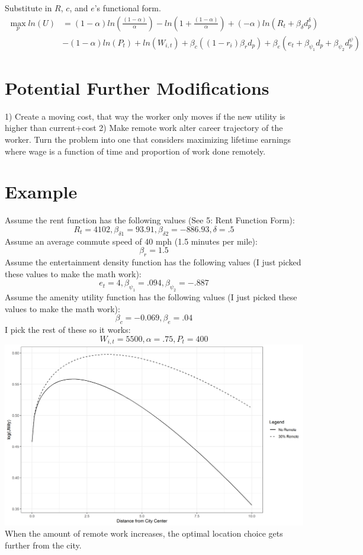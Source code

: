 \documentclass{article}
\begin{document}
Substitute in $R$, $c$, and $e$'s functional form.
\begin{equation*}
    \begin{aligned}
    \max_{p} ln(U) & = (1-\alpha)ln(\frac{(1 - \alpha)}{\alpha}) - ln(1 + \frac{(1 - \alpha)}{\alpha}) + (-\alpha)ln(R_{t} + \beta_\delta d_p^\delta)\\
    &  - (1-\alpha)ln(P_t) + ln(W_{i,t}) + \beta_c ((1-r_i)\beta_r d_p) + \beta_e (e_{t} + \beta_{\psi_1} d_p + \beta_{\psi_2} d_p^\psi)
    \end{aligned}
\end{equation*}

\section{Potential Further Modifications}
1) Create a moving cost, that way the worker only moves if the new utility is higher than current+cost
2) Make remote work alter career trajectory of the worker. Turn the problem into one that considers maximizing lifetime earnings where wage is a function of time and proportion of work done remotely.

\section{Example}
Assume the rent function has the following values (See 5: Rent Function Form):\\
$$R_{t} = 4102,  \beta_{\delta1} = 93.91, \beta_{\delta2} = -886.93, \delta = .5$$
Assume an average commute speed of 40 mph (1.5 minutes per mile):\\
$$\beta_r = 1.5$$
Assume the entertainment density function has the following values (I just picked these values to make the math work):\\
$$e_t = 4, \beta_{\psi_1} = .094, \beta_{\psi_2} = -.887$$
Assume the amenity utility function has the following values (I just picked these values to make the math work):\\
$$\beta_c = -0.069, \beta_e = .04$$
I pick the rest of these so it works:\\
$$W_{i,t} = 5500, \alpha = .75, P_t = 400$$
\includegraphics[scale=.5]{images/remote_effect.png}
When the amount of remote work increases, the optimal location choice gets further from the city.
\end{document}
